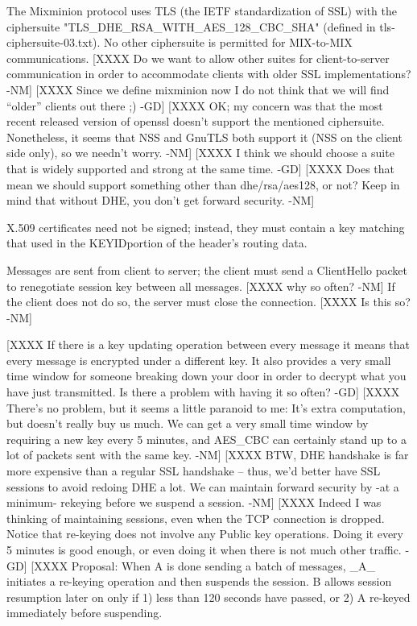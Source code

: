 The Mixminion protocol uses TLS (the IETF standardization of SSL) with
the ciphersuite "TLS_DHE_RSA_WITH_AES_128_CBC_SHA" (defined in
tls-ciphersuite-03.txt).  No other ciphersuite is permitted for
MIX-to-MIX communications.
[XXXX Do we want to allow other suites for client-to-server
      communication in order to accommodate clients with older SSL
      implementations? -NM]
[XXXX Since we define mixminion now I do not think that we will find
      ``older'' clients out there ;) -GD]
[XXXX OK; my concern was that the most recent released version of
      openssl doesn't support the mentioned ciphersuite.  Nonetheless,
      it seems that NSS and GnuTLS both support it (NSS on the client
      side only), so we needn't worry. -NM]  
[XXXX I think we should choose a suite that is widely supported and
      strong at the same time. -GD]
[XXXX Does that mean we should support something other than
      dhe/rsa/aes128, or not?  Keep in mind that without DHE, you
      don't get forward security. -NM]

X.509 certificates need not be signed; instead, they must contain
a key matching that used in the KEYIDportion of the header's routing
data.  

Messages are sent from client to server; the client must send a
ClientHello packet to renegotiate session key between all
messages. [XXXX why so often? -NM] If the client does not do so, the
server must close the connection.  [XXXX Is this so? -NM]

[XXXX If there is a key updating operation between every message it means
that every message is encrypted under a different key. It also
provides a very small time window for someone breaking down your door
in order to decrypt what you have just transmitted. Is there a problem
with having it so often? -GD]
[XXXX There's no problem, but it seems a little paranoid to me: It's
extra computation, but doesn't really buy us much.  We can get a very
small time window by requiring a new key every 5 minutes, and AES_CBC
can certainly stand up to a lot of packets sent with the same
key. -NM]
[XXXX BTW, DHE handshake is far more expensive than a regular SSL
handshake -- thus, we'd better have SSL sessions to avoid redoing DHE
a lot.  We can maintain forward security by -at a minimum- rekeying
before we suspend a session. -NM]
[XXXX Indeed I was thinking of maintaining sessions, even when the TCP
connection is dropped. Notice that re-keying does not involve any
Public key operations. Doing it every 5 minutes is good enough, or
even doing it when there is not much other traffic. -GD]
[XXXX
 Proposal: When A is done sending a batch of messages, _A_ initiates a
   re-keying operation and then suspends the session.  B allows
   session resumption later on only if 1) less than 120 seconds have
   passed, or 2) A re-keyed immediately before suspending.

